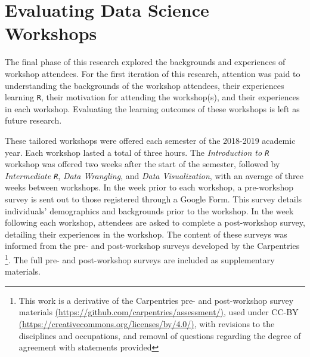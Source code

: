\documentclass[12pt]{article}
\begin{document}


\section{Evaluating Data Science Workshops}
\label{sec:implement}

\quad The final phase of this research explored the backgrounds and experiences
of workshop attendees. For the first iteration of this research, attention was
paid to understanding the backgrounds of the workshop attendees, their
experiences learning \texttt{R}, their motivation for attending the workshop(s),
and their experiences in each workshop. Evaluating the learning outcomes of
these workshops is left as future research. 

\quad These tailored workshops were offered each semester of the 2018-2019 
academic year. Each workshop lasted a total of three hours. The 
\emph{Introduction to \texttt{R}} workshop was offered two weeks after the start
of the semester, followed by \emph{Intermediate \texttt{R}}, \emph{Data 
Wrangling}, and \emph{Data Visualization}, with an average of three weeks
between workshops. In the week prior to each workshop, a pre-workshop survey is
sent out to those registered through a Google Form. This survey details 
individuals' demographics and backgrounds prior to the workshop. In the week
following each workshop, attendees are asked to complete a post-workshop survey,
detailing their experiences in the workshop. The content of these surveys was
informed from the pre- and post-workshop surveys developed by the Carpentries
\footnote{This work is a derivative of the Carpentries pre- and post-workshop
survey materials \href{https://github.com/carpentries/assessment/}{(https://github.com/carpentries/assessment/)}, used under CC-BY \href{https://creativecommons.org/licenses/by/4.0/}{(https://creativecommons.org/licenses/by/4.0/)}, with revisions to the disciplines and occupations, and removal of questions
regarding the degree of agreement with statements provided}. The full pre- and
post-workshop surveys are included as supplementary materials.
\end{document}

